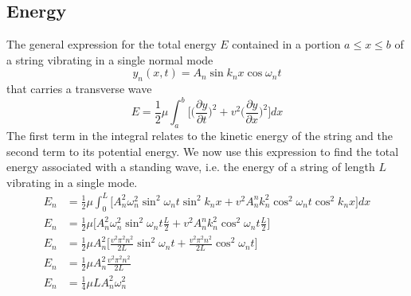 \documentclass[../../../main.tex]{subfiles}
\begin{document}
\subsection*{Energy}
The general expression for the total energy $E$ contained in a portion $a \leq x \leq b$ of a string vibrating in a single normal mode
\begin{equation*}
    y_n (x, t) = A_n \sin k_nx \cos \omega_nt
\end{equation*}
that carries a transverse wave
\begin{equation*}
    E=\frac{1}{2}\mu\int_{a}^{b}\biggl[ \biggl(\frac{\partial y}{\partial t}\biggr)^2 + v^2 \biggl(\frac{\partial y}{\partial x}\biggr)^2\biggr]dx
\end{equation*}
The ﬁrst term in the integral relates to the kinetic energy of the string and the second term to its potential energy. We now use this expression to ﬁnd the total energy associated with a standing wave, i.e. the energy of a string of length $L$ vibrating in a single mode.
\begin{align*}
    E_n&=\frac{1}{2}\mu\int_{0}^{L}\biggl[ A_n^2\omega_n^2\sin^2\omega_nt \sin^2k_nx + v^2 A_n^nk_n^2\cos^2\omega_n t\cos^2 k_nx\biggr]dx\\
    E_n&=\frac{1}{2}\mu\biggl[ A_n^2\omega_n^2\sin^2\omega_nt \frac{L}{2} + v^2 A_n^nk_n^2\cos^2\omega_nt \frac{L}{2}\biggr]\\
    E_n&=\frac{1}{2}\mu A_n^2\biggl[ \frac{v^2\pi^2 n^2}{2L}\sin^2\omega_nt  +  \frac{v^2\pi^2 n^2}{2L}\cos^2\omega_nt \biggr]\\
    E_n&=\frac{1}{2}\mu A_n^2\frac{v^2\pi^2 n^2}{2L}\\
    E_n&=\frac{1}{4}\mu LA_n^2\omega_n^2
\end{align*}
\end{document}
